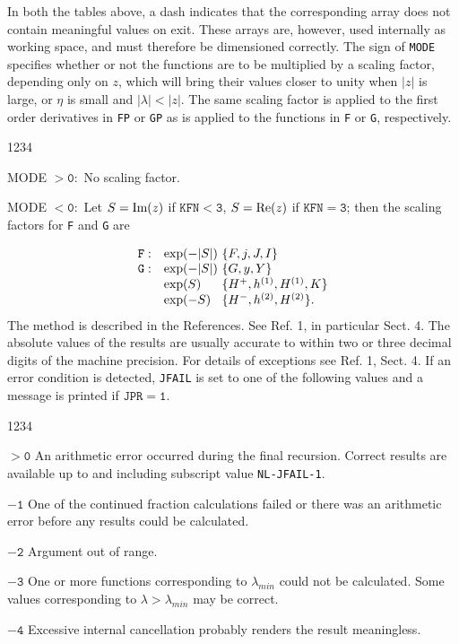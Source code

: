 In both the tables above, a dash indicates that the corresponding
array does not contain meaningful values on exit. These arrays are,
however, used internally as working space, and must therefore be
dimensioned correctly.
The sign of {\tt MODE} specifies whether or not the functions are to be
multiplied by a scaling factor, depending only on $z$, which will bring
their values closer to unity when $|z|$ is large, or $\eta$ is small
and $|\lambda|<|z|$. The same scaling factor is applied to the first
order derivatives in {\tt FP} or {\tt GP} as is
applied to the functions in {\tt F} or {\tt G}, respectively.
\begin{DLtt}{1234}
\newpage
\item[MODE] $\mathtt{>0:}$ No scaling factor.
\item[MODE] $\mathtt{<0:}$ Let $S=\mbox{\rm Im} (z)$ if
$\mathtt{KFN<3}$, $S=\mbox{\rm Re} (z)$ if $\mathtt{KFN=3}$;
then the scaling factors for {\tt F} and {\tt G} are
\end{DLtt}
$$ \begin{array}{ll@{\ }l}
 \mathtt{F:} & \exp(-|S|) &  \{F,j,J,I\} \\
 \mathtt{G:} & \exp(-|S|) &  \{G,y,Y\} \\
             & \exp(S)    &  \{H^{+},h^{(1)},H^{(1)},K\} \\
             & \exp(-S)   &  \{H^{-},h^{(2)},H^{(2)}\}.
\end{array} $$
\Method
The method is described in the References.
\Restrict
See Ref. 1, in particular Sect. 4.
\Accuracy
The absolute values of the results are usually
accurate to within two or three decimal digits of the machine
precision. For details of exceptions see Ref. 1, Sect. 4.
\Errorh
If an error condition is detected, {\tt JFAIL} is
set to one of the following values and a message is printed if
$\mathtt{JPR=1}$.
\begin{DLtt}{1234}
\item[$\mathtt{> 0}$]An arithmetic error occurred
during the final recursion. Correct results are available up to and
including subscript value {\tt NL-JFAIL-1}.
\item[$\mathtt{- 1}$] One of the continued fraction
calculations failed or there was an arithmetic error before any results
could be calculated.
\item[$\mathtt{- 2}$] Argument out of range.
\item[$\mathtt{- 3}$] One or more functions
corresponding to $\lambda_{min}$ could not be calculated. Some values
corresponding to $\lambda>\lambda_{min}$ may be correct.
\item[$\mathtt{- 4}$]  Excessive internal cancellation
probably renders the result meaningless.
\end{DLtt}
